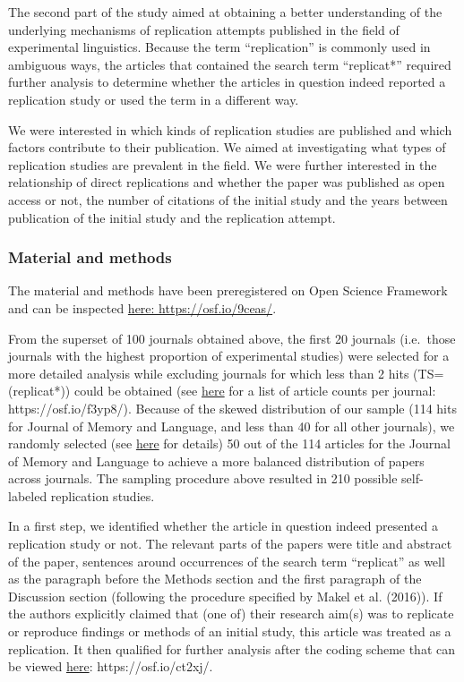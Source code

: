 \documentclass[]{elsarticle} %
\begin{document}
The second part of the study aimed at obtaining a better understanding
of the underlying mechanisms of replication attempts published in the
field of experimental linguistics. Because the term ``replication'' is
commonly used in ambiguous ways, the articles that contained the search
term ``replicat*'' required further analysis to determine whether the
articles in question indeed reported a replication study or used the
term in a different way.

We were interested in which kinds of replication studies are published
and which factors contribute to their publication. We aimed at
investigating what types of replication studies are prevalent in the
field. We were further interested in the relationship of direct
replications and whether the paper was published as open access or not,
the number of citations of the initial study and the years between
publication of the initial study and the replication attempt.

\hypertarget{material-and-methods-1}{%
\subsubsection{Material and methods}\label{material-and-methods-1}}

The material and methods have been preregistered on Open Science
Framework and can be inspected \href{https://osf.io/9ceas/}{here:
https://osf.io/9ceas/}.

From the superset of 100 journals obtained above, the first 20 journals
(i.e.~those journals with the highest proportion of experimental
studies) were selected for a more detailed analysis while excluding
journals for which less than 2 hits (TS=(replicat*)) could be obtained
(see \href{https://osf.io/f3yp8/}{here} for a list of article counts per
journal: https://osf.io/f3yp8/). Because of the skewed distribution of
our sample (114 hits for Journal of Memory and Language, and less than
40 for all other journals), we randomly selected (see
\href{https://osf.io/6vfpe/}{here} for details) 50 out of the 114
articles for the Journal of Memory and Language to achieve a more
balanced distribution of papers across journals. The sampling procedure
above resulted in 210 possible self-labeled replication studies.

In a first step, we identified whether the article in question indeed
presented a replication study or not. The relevant parts of the papers
were title and abstract of the paper, sentences around occurrences of
the search term ``replicat'' as well as the paragraph before the Methods
section and the first paragraph of the Discussion section (following the
procedure specified by Makel et al. (2016)). If the authors explicitly
claimed that (one of) their research aim(s) was to replicate or
reproduce findings or methods of an initial study, this article was
treated as a replication. It then qualified for further analysis after
the coding scheme that can be viewed \href{https://osf.io/ct2xj/}{here}:
https://osf.io/ct2xj/.
\end{document}
